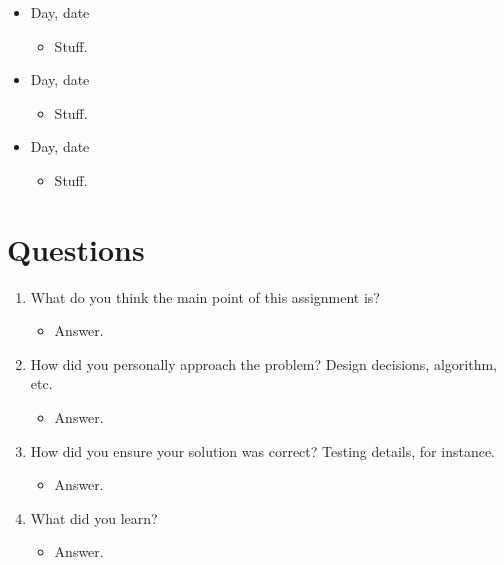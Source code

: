 \documentclass[letterpaper,10pt,onecolumn]{IEEEtran}
\begin{document}
    
    \begin{itemize}
        \item Day, date
            \begin{itemize} 
                \item Stuff.
        	\end{itemize}
        \item Day, date
            \begin{itemize} 
                \item Stuff.
        	\end{itemize}
        \item Day, date
            \begin{itemize} 
                \item Stuff.
        	\end{itemize}
    \end{itemize}
    
    
    \vspace{6mm}
    
   
    \section*{Questions}
    \begin{enumerate}
        \item What do you think the main point of this assignment is?
        \begin{itemize}
            \item Answer.
        \end{itemize}
        \item How did you personally approach the problem? Design decisions, algorithm, etc.
        \begin{itemize}
            \item Answer.
        \end{itemize}
        \item How did you ensure your solution was correct? Testing details, for instance.
        \begin{itemize}
            \item Answer. 
        \end{itemize}
        \item What did you learn?
        \begin{itemize}
            \item Answer.
        \end{itemize}
    \end{enumerate}
    
    
\end{document}

